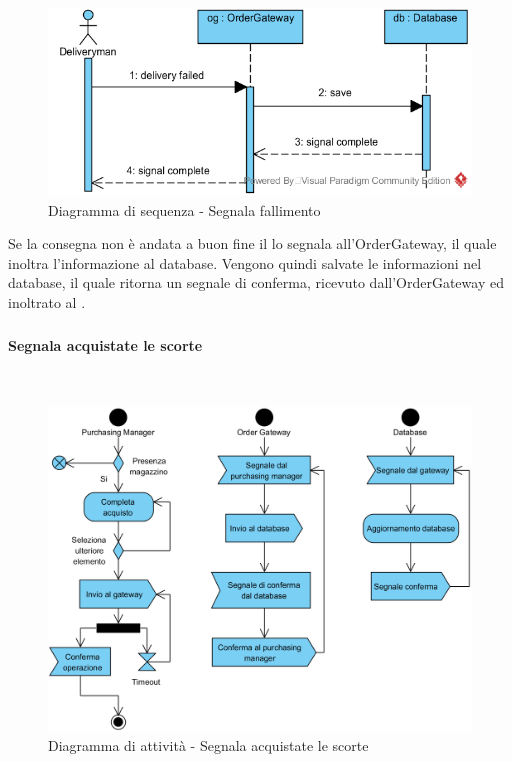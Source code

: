 \begin{figure}[H]
	\centering
	\includegraphics[width=14cm]{../../documenti/SpecificaTecnica/diagrammi_img/sequenza/fattorino_fallimento_consegna.png}
	\caption{Diagramma di sequenza - Segnala fallimento}
\end{figure}
Se la consegna non è andata a buon fine il \Deliveryman{} lo segnala all'Order\-Gateway, il quale inoltra l'informazione al database. Vengono quindi salvate le informazioni nel database, il quale ritorna un segnale di conferma, ricevuto dall'Order\-Gateway ed inoltrato al \Deliveryman{}.

\subsubsection{\Purchasingmanager{}}


\paragraph{Segnala acquistate le scorte}\mbox{}\\
\nopagebreak
\begin{figure}[H]
	\centering
	\includegraphics[width=14cm]{diagrammi_img/attivita/responsabile_acquisto.png}
	\caption{Diagramma di attività - Segnala acquistate le scorte}
\end{figure}

